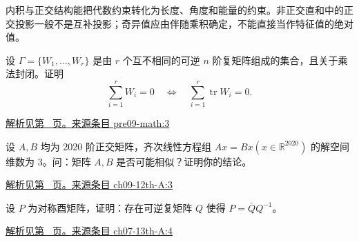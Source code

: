 \documentclass[UTF8,12pt,a4paper,fontset=fandol]{ctexart}
\begin{document}
\label{sec:questions-8}

内积与正交结构能把代数约束转化为长度、角度和能量的约束。非正交直和中的正交投影一般不是互补投影；奇异值应由伴随乘积确定，不能直接当作特征值的绝对值。

\begin{example}\label{ex:pre09-math:3}

设 $\Gamma=\{W_1,\ldots,W_r\}$ 是由 $r$ 个互不相同的可逆 $n$ 阶复矩阵组成的集合，且关于乘法封闭。证明
\[
\sum_{i=1}^rW_i=0\quad\Longleftrightarrow\quad
\sum_{i=1}^r\operatorname{tr}W_i=0.
\]

\par\hyperref[ans:pre09-math:3]{解析见第~\pageref{ans:pre09-math:3} 页。}\quad\href{https://github.com/lzxcr/cmc-mathematics/blob/64916fa1fdbc3e444a652eca204d5669058ee321/src/problems/preliminary/09/03.md}{来源条目 pre09-math:3}

\end{example}

\begin{example}\label{ex:ch09-12th-A:3}

设 $A,B$ 均为 2020 阶正交矩阵，齐次线性方程组 $Ax=Bx\left(x\in\mathbb{R}^{2020}\right)$ 的解空间维数为 3。问：矩阵 $A,B$ 是否可能相似？证明你的结论。

\par\hyperref[ans:ch09-12th-A:3]{解析见第~\pageref{ans:ch09-12th-A:3} 页。}\quad\href{https://github.com/lzxcr/cmc-mathematics/blob/64916fa1fdbc3e444a652eca204d5669058ee321/src/problems/preliminary/12/03.md}{来源条目 ch09-12th-A:3}

\end{example}

\begin{example}\label{ex:ch07-13th-A:4}

设 $P$ 为对称酉矩阵，证明：存在可逆复矩阵 $Q$ 使得 $P=\bar{Q}Q^{-1}$。

\par\hyperref[ans:ch07-13th-A:4]{解析见第~\pageref{ans:ch07-13th-A:4} 页。}\quad\href{https://github.com/lzxcr/cmc-mathematics/blob/64916fa1fdbc3e444a652eca204d5669058ee321/src/problems/preliminary/13/04.md}{来源条目 ch07-13th-A:4}

\end{example}
\end{document}
